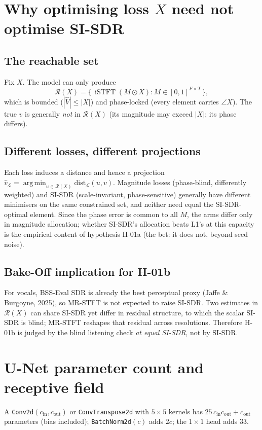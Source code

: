 \documentclass[11pt]{article}
\newcommand{\code}[1]{\texttt{#1}}
\newcommand{\iSTFT}{\operatorname{iSTFT}}
\DeclareMathOperator*{\argmin}{arg\,min}
\begin{document}
\section{Why optimising loss $X$ need not optimise SI-SDR}

\subsection{The reachable set}
Fix $X$. The model can only produce
\[
\mathcal R(X)=\bigl\{\,\iSTFT(M\odot X):M\in[0,1]^{F\times T}\,\bigr\},
\]
which is bounded ($|\widehat V|\le|X|$) and phase-locked (every element carries
$\angle X$). The true $v$ is generally \emph{not} in $\mathcal R(X)$ (its
magnitude may exceed $|X|$; its phase differs).

\subsection{Different losses, different projections}
Each loss induces a distance and hence a projection
$\hat v_{\mathcal L}=\argmin_{u\in\mathcal R(X)}\mathrm{dist}_{\mathcal L}(u,v)$.
Magnitude losses (phase-blind, differently weighted) and SI-SDR
(scale-invariant, phase-sensitive) generally have different minimisers on the
same constrained set, and neither need equal the SI-SDR-optimal element. Since
the phase error is common to all $M$, the arms differ only in magnitude
allocation; whether SI-SDR's allocation beats L1's at this capacity is the
empirical content of hypothesis H-01a (the bet: it does not, beyond seed noise).

\subsection{Bake-Off implication for H-01b}
For vocals, BSS-Eval SDR is already the best perceptual proxy (Jaffe \&
Burgoyne, 2025), so MR-STFT is not expected to raise SI-SDR. Two estimates in
$\mathcal R(X)$ can share SI-SDR yet differ in residual structure, to which the
scalar SI-SDR is blind; MR-STFT reshapes that residual across resolutions.
Therefore H-01b is judged by the blind listening check \emph{at equal SI-SDR},
not by SI-SDR.

\section{U-Net parameter count and receptive field}
A \code{Conv2d}$(c_{\mathrm{in}},c_{\mathrm{out}})$ or
\code{ConvTranspose2d} with $5\times5$ kernels has
$25\,c_{\mathrm{in}}c_{\mathrm{out}}+c_{\mathrm{out}}$ parameters (bias included);
\code{BatchNorm2d}$(c)$ adds $2c$; the $1\times1$ head adds $33$.
\end{document}
